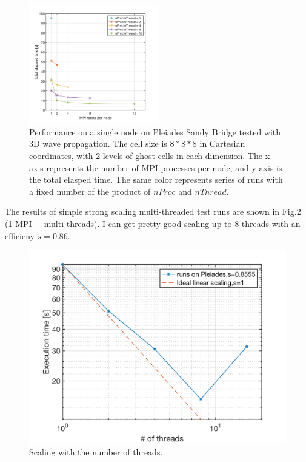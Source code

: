 \documentclass[fleqn,11pt]{SelfArx} %
\begin{document}
\begin{figure}[htbp]
\centering
\includegraphics[width=0.5\textwidth]{figures/sandybridge_timing}
\caption{Performance on a single node on Pleiades Sandy Bridge tested with 3D wave propagation. The cell size is $8*8*8$ in Cartesian coordinates, with 2 levels of ghost cells in each dimension. The x axis represents the number of MPI processes per node, and y axis is the total elasped time. The same color represents series of runs with a fixed number of the product of $nProc$ and $nThread$.}
\label{fig:sandy_timing}
\end{figure}

The results of simple strong scaling multi-threaded test runs are shown in Fig.\ref{fig:thread_scaling} (1 MPI + multi-threads). I can get pretty good scaling up to 8 threads with an efficieny $s=0.86$. 

\begin{figure}
\centering
\includegraphics[width=\textwidth]{figures/thread_scaling}
\caption{Scaling with the number of threads.}
\label{fig:thread_scaling}
\end{figure}
\end{document}
